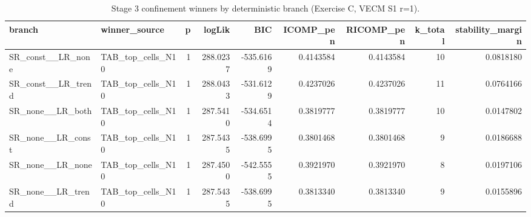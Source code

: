 \begin{table}[!h]
\centering
\caption{Stage 3 confinement winners by deterministic branch (Exercise C, VECM S1 r=1).}
\centering
\begin{tabular}[t]{llrrrrrrr}
\toprule
branch & winner\_source & p & logLik & BIC & ICOMP\_pen & RICOMP\_pen & k\_total & stability\_margin\\
\midrule
SR\_const\_\_LR\_none & TAB\_top\_cells\_N10 & 1 & 288.0237 & -535.6169 & 0.4143584 & 0.4143584 & 10 & 0.0818180\\
SR\_const\_\_LR\_trend & TAB\_top\_cells\_N10 & 1 & 288.0433 & -531.6129 & 0.4237026 & 0.4237026 & 11 & 0.0764166\\
SR\_none\_\_LR\_both & TAB\_top\_cells\_N10 & 1 & 287.5410 & -534.6514 & 0.3819777 & 0.3819777 & 10 & 0.0147802\\
SR\_none\_\_LR\_const & TAB\_top\_cells\_N10 & 1 & 287.5435 & -538.6995 & 0.3801468 & 0.3801468 & 9 & 0.0186688\\
SR\_none\_\_LR\_none & TAB\_top\_cells\_N10 & 1 & 287.4500 & -542.5555 & 0.3921970 & 0.3921970 & 8 & 0.0197106\\
\addlinespace
SR\_none\_\_LR\_trend & TAB\_top\_cells\_N10 & 1 & 287.5435 & -538.6995 & 0.3813340 & 0.3813340 & 9 & 0.0155896\\
\bottomrule
\end{tabular}
\end{table}
